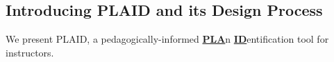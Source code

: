 
\subsection{Introducing PLAID and its Design Process}
We present PLAID, a pedagogically-informed 
\textbf{\ul{PLA}}n \textbf{\ul{ID}}entification tool for instructors. 

